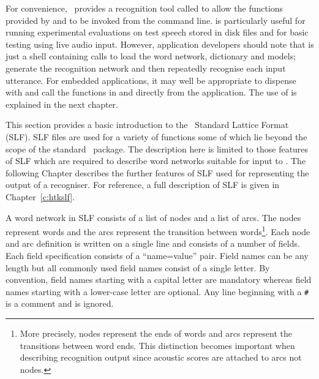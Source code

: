 
For convenience, \HTK\ provides a recognition tool called 
to allow the functions provided by  and 
to be invoked from the command line.  is particularly
useful for running experimental evaluations on test speech stored
in disk files and for basic testing using live audio input.
However, application developers
should note that  is just a shell containing calls to
load the word network, dictionary and models; generate the recognition
network and then repeatedly recognise each input utterance.
For embedded applications, it may well be appropriate to
dispense with  and call the functions in 
 and  directly from the application.
The use of  is explained in the next chapter.


This section provides a basic introduction to the \HTK\ Standard Lattice
Format (SLF). SLF files are used for a variety of functions some of
which lie beyond the scope of the standard \HTK\ package.   The
description here is limited to those features of SLF which are required
to describe word networks suitable for input to .  The
following Chapter describes the further features of SLF used for
representing the output of a recogniser. For reference, a full
description of SLF is given in Chapter~\ref{c:htkslf}.

A word network in SLF consists of a list of nodes and a list of arcs.  
The nodes represent words and the arcs represent the transition between
words\footnote{More precisely, nodes represent the ends of
words and arcs represent the transitions between word ends.
This distinction becomes important when describing
recognition output since acoustic scores are attached
to arcs not nodes. }.  
Each node and arc definition is written on a single line and
consists of a number of fields. Each field specification consists of a
``name=value'' pair. Field names can be any length but all commonly used
field names consist of a single letter.  By convention, field names
starting  with a capital letter are mandatory  whereas field names
starting with a lower-case letter are optional.  Any line beginning with
a \texttt{\#} is a comment and is ignored.


